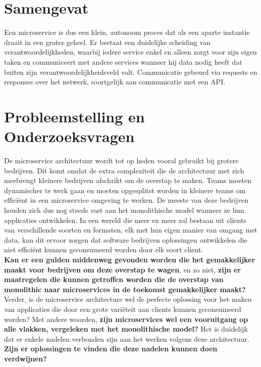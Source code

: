 \section{Samengevat}
\label{sec:samengevat}
Een microservice is dus een klein, autonoom proces dat als een aparte instantie draait in een groter geheel. Er bestaat een duidelijke scheiding van verantwoordelijkheden, waarbij iedere service enkel en alleen zorgt voor zijn eigen taken en communiceert met andere services wanneer hij data nodig heeft dat buiten zijn verantwoordelijkheidsveld valt. Communicatie gebeurd via requests en responses over het netwerk, soortgelijk aan communicatie met een API.

\section{Probleemstelling en Onderzoeksvragen}
\label{sec:onderzoeksvragen}


De microservice architectuur wordt tot op heden vooral gebruikt bij grotere bedrijven. Dit komt omdat de extra complexiteit die de architectuur met zich meebrengt kleinere bedrijven afschrikt om de overstap te maken. Teams moeten dynamischer te werk gaan en moeten opgesplitst worden in kleinere teams om efficiënt in een microservice omgeving te werken. De meeste van deze bedrijven houden zich dus nog steeds vast aan het monolithische model wanneer ze hun applicaties ontwikkelen. In een wereld die meer en meer zal bestaan uit clients van verschillende soorten en formaten, elk met hun eigen manier van omgang met data, kan dit ervoor zorgen dat software bedrijven oplossingen ontwikkelen die niet efficiënt kunnen geconsumeerd worden door elk soort client.
\\
\textbf{Kan er een gulden middenweg gevonden worden die het gemakkelijker maakt voor bedrijven om deze overstap te wagen}, en zo niet, \textbf{zijn er maatregelen die kunnen getroffen worden die de overstap van monolithic naar microservices in de toekomst gemakkelijker maakt?}
\\
Verder, is de microservice architecture wel de perfecte oplossing voor het maken van applicaties die door een grote variëteit aan clients kunnen geconsumeerd worden? Met andere woorden, \textbf{zijn microservices wel een vooruitgang op alle vlakken, vergeleken met het monolithische model?} Het is duidelijk dat er enkele nadelen verbonden zijn aan het werken volgens deze architectuur. \textbf{Zijn er oplossingen te vinden die deze nadelen kunnen doen verdwijnen?}